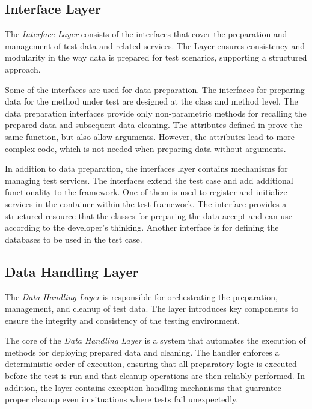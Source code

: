 \subsection{Interface Layer}
The \textit{Interface Layer} consists of the interfaces that cover the preparation and management of test data and related services. The Layer ensures consistency and modularity in the way data is prepared for test scenarios, supporting a structured approach.

Some of the interfaces are used for data preparation. The interfaces for preparing data for the method under test are designed at the class and method level. The data preparation interfaces provide only non-parametric methods for recalling the prepared data and subsequent data cleaning.  The attributes defined in  prove the same function, but also allow arguments.  However, the attributes lead to more complex code, which is not needed when preparing data without arguments.

In addition to data preparation, the interfaces layer contains mechanisms for managing test services. The interfaces extend the test case and add additional functionality to the framework. One of them is used to register and initialize services in the container within the test framework. 
The interface provides a structured resource that the classes for preparing the data accept and can use according to the developer's thinking.
Another interface is for defining the databases to be used in the test case. 


\subsection{Data Handling Layer}

The \textit{Data Handling Layer} is responsible for orchestrating the preparation, management, and cleanup of test data. The layer introduces key components to ensure the integrity and consistency of the testing environment.

The core of the \textit{Data Handling Layer} is a system that automates the execution of methods for deploying prepared data and cleaning. The handler enforces a deterministic order of execution, ensuring that all preparatory logic is executed before the test is run and that cleanup operations are then reliably performed. In addition, the layer contains exception handling mechanisms that guarantee proper cleanup even in situations where tests fail unexpectedly.

